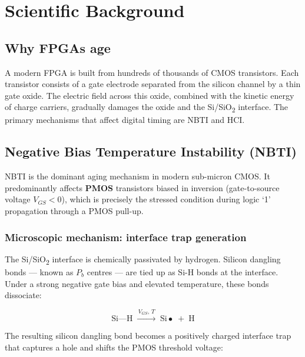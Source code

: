 \documentclass[12pt, a4paper]{report}
\begin{document}
\chapter{Scientific Background}
\label{ch:background}

\section{Why FPGAs age}

A modern FPGA is built from hundreds of thousands of CMOS transistors. Each transistor
consists of a gate electrode separated from the silicon channel by a thin gate oxide.
The electric field across this oxide, combined with the kinetic energy of charge carriers,
gradually damages the oxide and the Si/SiO\textsubscript{2} interface. The primary
mechanisms that affect digital timing are NBTI and HCI.

\section{Negative Bias Temperature Instability (NBTI)}

NBTI is the dominant aging mechanism in modern sub-micron CMOS. It predominantly
affects \textbf{PMOS} transistors biased in inversion (gate-to-source voltage $V_{GS} < 0$),
which is precisely the stressed condition during logic `1' propagation through a PMOS pull-up.

\subsection{Microscopic mechanism: interface trap generation}

The Si/SiO\textsubscript{2} interface is chemically passivated by hydrogen. Silicon
dangling bonds --- known as $P_b$ centres --- are tied up as Si-H bonds at the interface.
Under a strong negative gate bias and elevated temperature, these bonds dissociate:

\begin{equation}
  \text{Si} \text{---} \text{H} \;\xrightarrow{\,V_{GS},\,T\,}\; \text{Si}\bullet \;+\; \text{H}
\end{equation}

The resulting silicon dangling bond becomes a positively charged interface trap that
captures a hole and shifts the PMOS threshold voltage:
\end{document}
